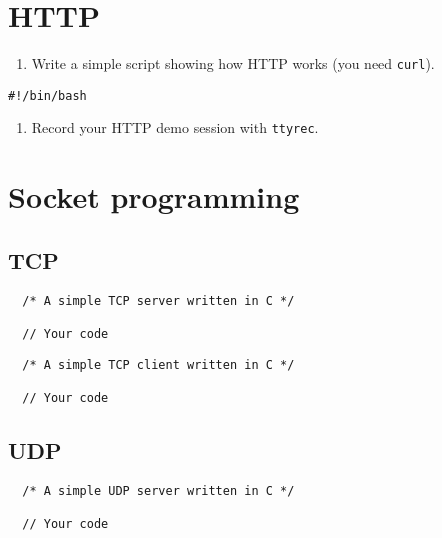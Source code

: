 \documentclass{swfulabreport}
\begin{document}
\hypertarget{http}{%
\section{HTTP}\label{http}}

\begin{enumerate}
\def\labelenumi{\arabic{enumi}.}
\tightlist
\item
  Write a simple script showing how HTTP works (you need
  \texttt{curl}).
\end{enumerate}

\begin{verbatim}
#!/bin/bash
\end{verbatim}

\begin{enumerate}
\def\labelenumi{\arabic{enumi}.}
\setcounter{enumi}{1}
\tightlist
\item
  Record your HTTP demo session with \texttt{ttyrec}.
\end{enumerate}

\hypertarget{socket-programming}{%
\section{Socket programming}\label{socket-programming}}

\hypertarget{tcp}{%
\subsection{TCP}\label{tcp}}

\begin{verbatim}
  /* A simple TCP server written in C */

  // Your code
\end{verbatim}

\begin{verbatim}
  /* A simple TCP client written in C */

  // Your code
\end{verbatim}

\hypertarget{udp}{%
\subsection{UDP}\label{udp}}

\begin{verbatim}
  /* A simple UDP server written in C */

  // Your code
\end{verbatim}
\end{document}
